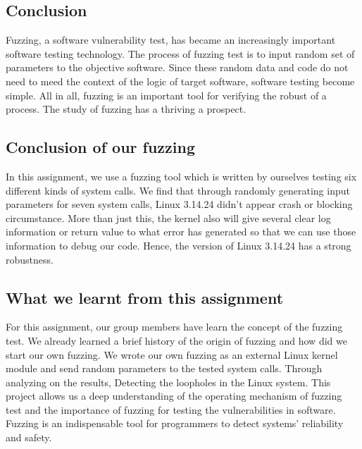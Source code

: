 \documentclass[twoside]{article}
\begin{document}
\begin{multicols}{2}
\section{Conclusion}
Fuzzing, a software vulnerability test, has became an increasingly important software testing technology. The process of fuzzing test is to input random set of parameters to the objective software.  Since these random data and code do not need to meed the context of the logic of target software, software testing become simple. All in all, fuzzing is an important  tool for verifying the robust of a process. The study of fuzzing has a thriving a prospect.
\subsection{Conclusion of our fuzzing}
In this assignment, we use a fuzzing tool which is written by ourselves testing six different kinds of system calls. We find that through randomly generating input parameters for seven system calls, Linux 3.14.24 didn’t appear crash or blocking circumstance. More than just this, the kernel also will give several clear log information or return value to what error has generated so that we can use those information to debug our code. Hence, the version of Linux 3.14.24 has a strong robustness.
\subsection{What we learnt from this assignment}
For this assignment, our group members have learn the concept of the fuzzing test. We already learned a brief history of the origin of fuzzing and how did we start our own fuzzing. We wrote our own fuzzing as an external Linux kernel module and send random parameters to the tested system calls. Through analyzing on the results, Detecting the loopholes in the Linux system. This project allows us a deep understanding of the operating mechanism of fuzzing test and the importance of fuzzing for testing the  vulnerabilities in software. Fuzzing is an indispensable tool for programmers to detect systems’ reliability and safety.
\end{multicols}
\newpage
\appendix


\newpage
\end{document}
